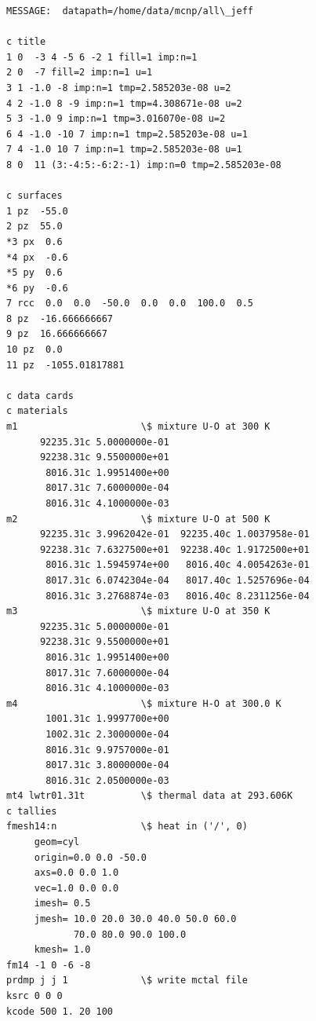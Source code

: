\documentclass[a4paper,10pt,twocolumn,english]{sphinxsnamc2013}
\begin{document}
\begin{Verbatim}[commandchars=\\\{\}]
MESSAGE:  datapath=/home/data/mcnp/all\_jeff

c title
1 0  -3 4 -5 6 -2 1 fill=1 imp:n=1      
2 0  -7 fill=2 imp:n=1 u=1              
3 1 -1.0 -8 imp:n=1 tmp=2.585203e-08 u=2          
4 2 -1.0 8 -9 imp:n=1 tmp=4.308671e-08 u=2        
5 3 -1.0 9 imp:n=1 tmp=3.016070e-08 u=2           
6 4 -1.0 -10 7 imp:n=1 tmp=2.585203e-08 u=1       
7 4 -1.0 10 7 imp:n=1 tmp=2.585203e-08 u=1        
8 0  11 (3:-4:5:-6:2:-1) imp:n=0 tmp=2.585203e-08 

c surfaces
1 pz  -55.0
2 pz  55.0
*3 px  0.6
*4 px  -0.6
*5 py  0.6
*6 py  -0.6
7 rcc  0.0  0.0  -50.0  0.0  0.0  100.0  0.5
8 pz  -16.666666667
9 pz  16.666666667
10 pz  0.0
11 pz  -1055.01817881

c data cards
c materials
m1                      \$ mixture U-O at 300 K
      92235.31c 5.0000000e-01
      92238.31c 9.5500000e+01
       8016.31c 1.9951400e+00
       8017.31c 7.6000000e-04
       8016.31c 4.1000000e-03
m2                      \$ mixture U-O at 500 K
      92235.31c 3.9962042e-01  92235.40c 1.0037958e-01
      92238.31c 7.6327500e+01  92238.40c 1.9172500e+01
       8016.31c 1.5945974e+00   8016.40c 4.0054263e-01
       8017.31c 6.0742304e-04   8017.40c 1.5257696e-04
       8016.31c 3.2768874e-03   8016.40c 8.2311256e-04
m3                      \$ mixture U-O at 350 K
      92235.31c 5.0000000e-01
      92238.31c 9.5500000e+01
       8016.31c 1.9951400e+00
       8017.31c 7.6000000e-04
       8016.31c 4.1000000e-03
m4                      \$ mixture H-O at 300.0 K
       1001.31c 1.9997700e+00
       1002.31c 2.3000000e-04
       8016.31c 9.9757000e-01
       8017.31c 3.8000000e-04
       8016.31c 2.0500000e-03
mt4 lwtr01.31t          \$ thermal data at 293.606K
c tallies
fmesh14:n               \$ heat in ('/', 0)
     geom=cyl
     origin=0.0 0.0 -50.0
     axs=0.0 0.0 1.0
     vec=1.0 0.0 0.0
     imesh= 0.5
     jmesh= 10.0 20.0 30.0 40.0 50.0 60.0 
            70.0 80.0 90.0 100.0
     kmesh= 1.0
fm14 -1 0 -6 -8
prdmp j j 1             \$ write mctal file
ksrc 0 0 0
kcode 500 1. 20 100
\end{Verbatim}
\end{document}
